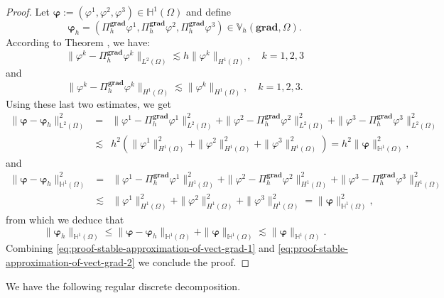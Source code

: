 \begin{proof}
Let $\bm{\varphi}:=\left(\varphi^1,\varphi^2,\varphi^3\right) \in \mathbb{H}^1(\Omega)$ and define 
$$\bm{\varphi}_h= \left(\Pi_h^{\textbf{grad}} \varphi^1,\Pi_h^{\textbf{grad}} \varphi^2,\Pi_h^{\textbf{grad}} \varphi^3\right) \in \mathbb{V}_h(\textbf{grad},\Omega).$$
According to Theorem \cite[Theorem 5.3]{buffa2011isogeometric}, we have:
$$
\|\varphi^k - \Pi_h^{\textbf{grad}} \varphi^k\|_{L^2(\Omega)} \lesssim  h \|\varphi^k\|_{H^1(\Omega)}, \quad k=1,2,3 
$$
and
$$
\|\varphi^k - \Pi_h^{\textbf{grad}} \varphi^k\|_{H^1(\Omega)} \lesssim \|\varphi^k\|_{H^1(\Omega)}, \quad k=1,2,3. 
$$
Using these last two estimates, we get 
\begin{eqnarray}\label{eq:proof-stable-approximation-of-vect-grad-1}
\|\bm{\varphi} -\bm{\varphi}_h \|_{\mathbb{L}^2(\Omega)}^2 &=& \|\varphi^1 - \Pi_h^{\textbf{grad}} \varphi^1\|_{L^2(\Omega)}^2+\|\varphi^2 - \Pi_h^{\textbf{grad}} \varphi^2\|_{L^2(\Omega)}^2+\|\varphi^3 - \Pi_h^{\textbf{grad}} \varphi^3\|_{L^2(\Omega)}^2 \nonumber \\
& \lesssim & h^2 \left( \|\varphi^1\|_{H^1(\Omega)}^2 + \|\varphi^2\|_{H^1(\Omega)}^2 + \|\varphi^3\|_{H^1(\Omega)}^2 \right)= h^2 \|\bm{\varphi}\|_{\mathbb{H}^1(\Omega)}^2,
\end{eqnarray}
and
\begin{eqnarray*}
\|\bm{\varphi} -\bm{\varphi}_h \|_{\mathbb{H}^1(\Omega)}^2 &=& \|\varphi^1 - \Pi_h^{\textbf{grad}} \varphi^1\|_{H^1(\Omega)}^2+\|\varphi^2 - \Pi_h^{\textbf{grad}} \varphi^2\|_{H^1(\Omega)}^2+\|\varphi^3 - \Pi_h^{\textbf{grad}} \varphi^3\|_{H^1(\Omega)}^2\\
& \lesssim &  \|\varphi^1\|_{H^1(\Omega)}^2 + \|\varphi^2\|_{H^1(\Omega)}^2 + \|\varphi^3\|_{H^1(\Omega)}^2= \|\bm{\varphi}\|_{\mathbb{H}^1(\Omega)}^2,
\end{eqnarray*}
from which we deduce that 
\begin{equation}\label{eq:proof-stable-approximation-of-vect-grad-2}
\|\bm{\varphi}_h\|_{\mathbb{H}^1(\Omega)} \leq \|\bm{\varphi} -\bm{\varphi}_h \|_{\mathbb{H}^1(\Omega)} + \|\bm{\varphi}\|_{\mathbb{H}^1(\Omega)} \lesssim  \|\bm{\varphi}\|_{\mathbb{H}^1(\Omega)}.
\end{equation}
Combining \eqref{eq:proof-stable-approximation-of-vect-grad-1} and \eqref{eq:proof-stable-approximation-of-vect-grad-2} we conclude the proof.
\end{proof}

We have the following regular discrete decomposition.

